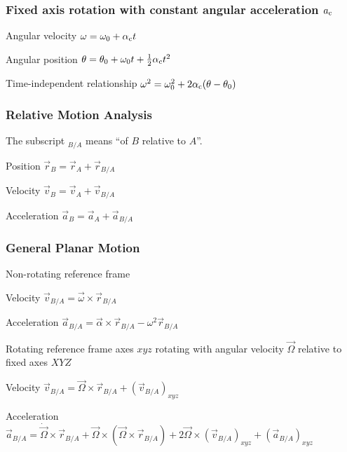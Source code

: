 \documentclass{article}
\begin{document}
\subsubsection{Fixed axis rotation with constant angular acceleration \(a_{\mathrm{c}}\)}

\begin{description*}
\item[Angular velocity]
  \(\omega = \omega_0 + \alpha_{\mathrm{c}}t\)
\item[Angular position]
  \(\theta = \theta_0 + \omega_0t + \frac12\alpha_{\mathrm{c}}t^2\)
\item[Time-independent relationship]
  \(\omega^2 = \omega_0^2 + 2\alpha_{\mathrm{c}}(\theta-\theta_0)\)
\end{description*}

\subsubsection{Relative Motion Analysis}

The subscript ${}_{B/A}$ means ``of $B$ relative to $A$''.

\begin{description*}
\item[Position]
  \(\vec{r}_B = \vec{r}_A + \vec{r}_{B/A}\)
\item[Velocity]
  \(\vec{v}_B = \vec{v}_A + \vec{v}_{B/A}\)
\item[Acceleration]
  \(\vec{a}_B = \vec{a}_A + \vec{a}_{B/A}\)
\end{description*}

\subsubsection{General Planar Motion}

\begin{description*}
\item[Non-rotating reference frame]~
  \begin{description*}
  \item[Velocity]
    \(\vec{v}_{B/A} = \vec{\omega}\times\vec{r}_{B/A}\)
  \item[Acceleration]
    \(\vec{a}_{B/A} = \vec\alpha\times\vec{r}_{B/A} - \omega^2\vec{r}_{B/A}\)
  \end{description*}
\item[Rotating reference frame] axes $xyz$ rotating with angular velocity $\vec\Omega$
  relative to fixed axes $XYZ$
  \begin{description*}
  \item[Velocity]
    \(\vec{v}_{B/A} = \vec\Omega\times\vec{r}_{B/A} + {(\vec{v}_{B/A})}_{xyz}\)
  \item[Acceleration]
    \(\vec{a}_{B/A} = \dot{\vec\Omega}\times\vec{r}_{B/A} + \vec\Omega\times(\vec\Omega\times\vec{r}_{B/A})
    + 2\vec\Omega\times{(\vec{v}_{B/A})}_{xyz} + {(\vec{a}_{B/A})}_{xyz}\)
  \end{description*}
\end{description*}
\end{document}
